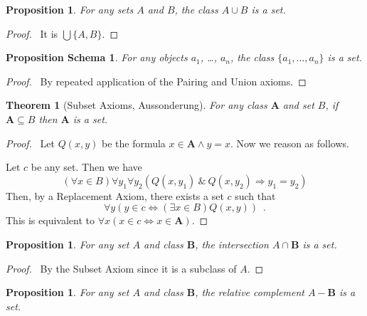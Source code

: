 \documentclass{article}
\let\qed\relax
\newtheorem{proposition}[axiom]{Proposition}
\newtheorem{props}[axiom]{Proposition Schema}
\newtheorem{theorem}[axiom]{Theorem}
\theoremstyle{definition}
\begin{document}
    \begin{proposition}
        For any sets $A$ and $B$, the class $A \cup B$ is a set.
    \end{proposition}

    \begin{proof}
        \pf\ It is $\bigcup \{ A, B \}$. \qed
    \end{proof}

    \begin{props}
        For any objects $a_1$, \ldots, $a_n$, the class $\{ a_1, \ldots, a_n \}$ is a set.
    \end{props}

    \begin{proof}
        \pf\ By repeated application of the Pairing and Union axioms. \qed
    \end{proof}

    \begin{theorem}[Subset Axioms, Aussonderung]
        For any class $\mathbf{A}$ and set $B$, if $\mathbf{A} \subseteq B$ then $\mathbf{A}$ is a set.
    \end{theorem}

    \begin{proof}
        \pf\      Let $Q(x,y)$ be the formula $x \in \mathbf{A} \wedge y = x$. Now we reason as follows.
     
        Let $c$ be any set. Then we have
        \[ (\forall x \in B) \forall y_1 \forall y_2 (Q(x,y_1) \ \&\ Q(x,y_2) \Rightarrow y_1 = y_2) \]
        Then, by a Replacement Axiom, there exists a set $c$ such that
        \[ \forall y (y \in c \Leftrightarrow (\exists x \in B) Q(x,y)) \enspace . \]
        This is equivalent to $\forall x (x \in c \Leftrightarrow x \in \mathbf{A})$. \qed
    \end{proof}

    \begin{proposition}
        For any set $A$ and class $\mathbf{B}$, the intersection $A \cap \mathbf{B}$ is a set.
    \end{proposition}

    \begin{proof}
        \pf\ By the Subset Axiom since it is a subclass of $A$. \qed
    \end{proof}

    \begin{proposition}
        For any set $A$ and class $\mathbf{B}$, the relative complement $A - \mathbf{B}$ is a set.
    \end{proposition}
\end{document}
